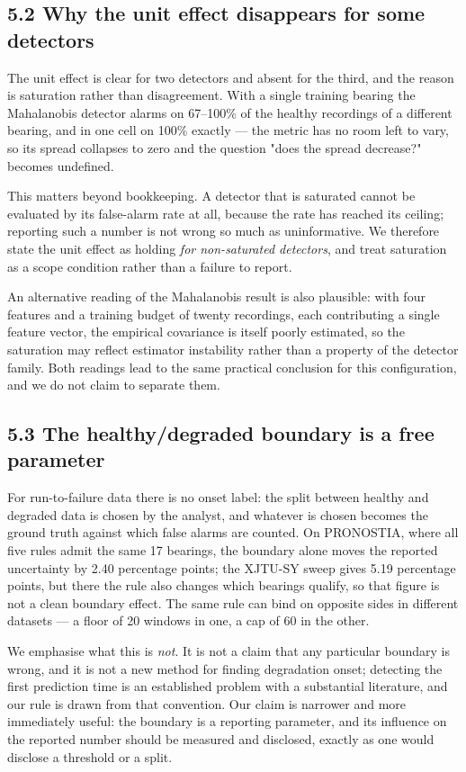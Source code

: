 \documentclass[11pt]{article}
\begin{document}
\subsection{5.2 Why the unit effect disappears for some detectors}

The unit effect is clear for two detectors and absent for the third, and the reason is saturation rather than disagreement. With a single training bearing the Mahalanobis detector alarms on 67--100\% of the healthy recordings of a different bearing, and in one cell on 100\% exactly --- the metric has no room left to vary, so its spread collapses to zero and the question "does the spread decrease?" becomes undefined.

This matters beyond bookkeeping. A detector that is saturated cannot be evaluated by its false-alarm rate at all, because the rate has reached its ceiling; reporting such a number is not wrong so much as uninformative. We therefore state the unit effect as holding \emph{for non-saturated detectors}, and treat saturation as a scope condition rather than a failure to report.

An alternative reading of the Mahalanobis result is also plausible: with four features and a training budget of twenty recordings, each contributing a single feature vector, the empirical covariance is itself poorly estimated, so the saturation may reflect estimator instability rather than a property of the detector family. Both readings lead to the same practical conclusion for this configuration, and we do not claim to separate them.

\subsection{5.3 The healthy/degraded boundary is a free parameter}

For run-to-failure data there is no onset label: the split between healthy and degraded data is chosen by the analyst, and whatever is chosen becomes the ground truth against which false alarms are counted. On PRONOSTIA, where all five rules admit the same 17 bearings, the boundary alone moves the reported uncertainty by 2.40 percentage points; the XJTU-SY sweep gives 5.19 percentage points, but there the rule also changes which bearings qualify, so that figure is not a clean boundary effect. The same rule can bind on opposite sides in different datasets --- a floor of 20 windows in one, a cap of 60 in the other.

We emphasise what this is \emph{not}. It is not a claim that any particular boundary is wrong, and it is not a new method for finding degradation onset; detecting the first prediction time is an established problem with a substantial literature, and our rule is drawn from that convention. Our claim is narrower and more immediately useful: the boundary is a reporting parameter, and its influence on the reported number should be measured and disclosed, exactly as one would disclose a threshold or a split.
\end{document}
